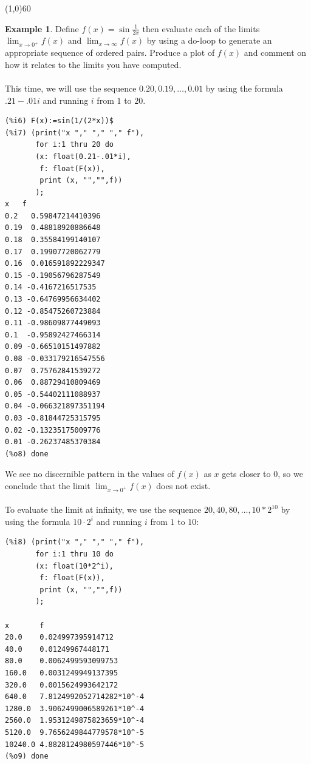 \documentclass[10.5pt,twoside]{report}
\theoremstyle{definition}
\newtheorem{exmp}{Example}[section]
\begin{document}
\line(1,0){60}
\linethickness{0.5mm}
\pagebreak

\begin{exmp}

Define $f(x)=\sin{\frac{1}{2x}}$ then evaluate each of the limits $\lim_{x \to 0^{+}}f(x)$ and $\lim_{x \to \infty}f(x)$ by using a do-loop to generate an appropriate sequence of ordered pairs.  Produce a plot of $f(x)$ and comment on how it relates to the limits you have computed.\\
${}$\\
This time, we will use the sequence $0.20,0.19,\dots,0.01$ by using the formula $.21-.01i$ and running $i$ from $1$ to $20$.

\begin{verbatim}
(%i6) F(x):=sin(1/(2*x))$
(%i7) (print("x "," "," "," f"),
       for i:1 thru 20 do
       (x: float(0.21-.01*i),
        f: float(F(x)),
        print (x, "","",f))
       );
x   f
0.2   0.59847214410396
0.19  0.48818920886648
0.18  0.35584199140107
0.17  0.19907720062779
0.16  0.016591892229347
0.15 -0.19056796287549
0.14 -0.4167216517535
0.13 -0.64769956634402
0.12 -0.85475260723884
0.11 -0.98609877449093
0.1  -0.95892427466314
0.09 -0.66510151497882
0.08 -0.033179216547556
0.07  0.75762841539272
0.06  0.88729410809469
0.05 -0.54402111088937
0.04 -0.066321897351194
0.03 -0.81844725315795
0.02 -0.13235175009776
0.01 -0.26237485370384
(%o8) done
\end{verbatim}

We see no discernible pattern in the values of $f(x)$ as $x$ gets closer to $0$, so we conclude that the limit $\lim_{x \to 0^{+}}f(x)$ does not exist.\\
${}$\\
To evaluate the limit at infinity, we use the sequence $20,40,80,\dots,10*2^{10}$ by using the formula $10\cdot 2^i$ and running $i$ from $1$ to $10$:

\begin{verbatim}
(%i8) (print("x "," "," "," f"),
       for i:1 thru 10 do
       (x: float(10*2^i),
        f: float(F(x)),
        print (x, "","",f))
       );    
         
x       f
20.0    0.024997395914712
40.0    0.01249967448171
80.0    0.0062499593099753
160.0   0.0031249949137395
320.0   0.0015624993642172
640.0   7.8124992052714282*10^-4
1280.0  3.9062499006589261*10^-4
2560.0  1.9531249875823659*10^-4
5120.0  9.7656249844779578*10^-5
10240.0 4.8828124980597446*10^-5
(%o9) done
\end{verbatim}


\end{exmp}
\end{document}
